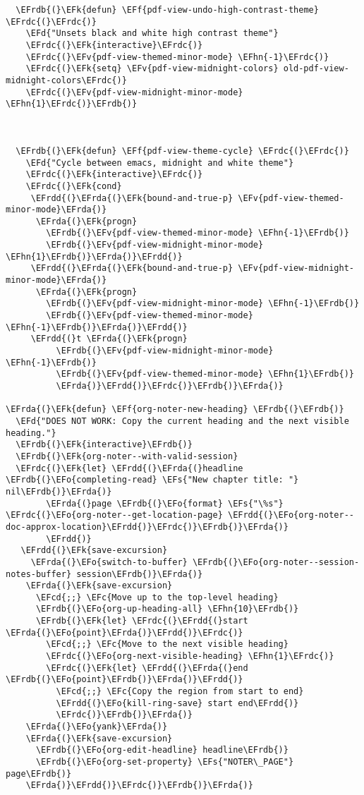 \documentclass[a4wide,10pt]{article}
\newcommand{\EFc}[1]{\textcolor{EFc}{#1}} %
\newcommand{\EFcd}[1]{\textcolor{EFcd}{#1}} %
\newcommand{\EFs}[1]{\textcolor{EFs}{#1}} %
\newcommand{\EFd}[1]{\textcolor{EFd}{#1}} %
\newcommand{\EFk}[1]{\textcolor{EFk}{#1}} %
\newcommand{\EFf}[1]{\textcolor{EFf}{#1}} %
\newcommand{\EFv}[1]{\textcolor{EFv}{#1}} %
\newcommand{\EFo}[1]{\textcolor{EFo}{#1}} %
\newcommand{\EFhn}[1]{\textcolor{EFhn}{\textbf{#1}}} %
\newcommand{\EFrda}[1]{\textcolor{EFrda}{#1}} %
\newcommand{\EFrdb}[1]{\textcolor{EFrdb}{#1}} %
\newcommand{\EFrdc}[1]{\textcolor{EFrdc}{#1}} %
\newcommand{\EFrdd}[1]{\textcolor{EFrdd}{#1}} %
\begin{document}
\begin{Code}
\begin{Verbatim}
  \EFrdb{(}\EFk{defun} \EFf{pdf-view-undo-high-contrast-theme} \EFrdc{(}\EFrdc{)}
    \EFd{"Unsets black and white high contrast theme"}
    \EFrdc{(}\EFk{interactive}\EFrdc{)}
    \EFrdc{(}\EFv{pdf-view-themed-minor-mode} \EFhn{-1}\EFrdc{)}
    \EFrdc{(}\EFk{setq} \EFv{pdf-view-midnight-colors} old-pdf-view-midnight-colors\EFrdc{)}
    \EFrdc{(}\EFv{pdf-view-midnight-minor-mode} \EFhn{1}\EFrdc{)}\EFrdb{)}



  \EFrdb{(}\EFk{defun} \EFf{pdf-view-theme-cycle} \EFrdc{(}\EFrdc{)}
    \EFd{"Cycle between emacs, midnight and white theme"}
    \EFrdc{(}\EFk{interactive}\EFrdc{)}
    \EFrdc{(}\EFk{cond}
     \EFrdd{(}\EFrda{(}\EFk{bound-and-true-p} \EFv{pdf-view-themed-minor-mode}\EFrda{)}
      \EFrda{(}\EFk{progn}
        \EFrdb{(}\EFv{pdf-view-themed-minor-mode} \EFhn{-1}\EFrdb{)}
        \EFrdb{(}\EFv{pdf-view-midnight-minor-mode} \EFhn{1}\EFrdb{)}\EFrda{)}\EFrdd{)}
     \EFrdd{(}\EFrda{(}\EFk{bound-and-true-p} \EFv{pdf-view-midnight-minor-mode}\EFrda{)}
      \EFrda{(}\EFk{progn}
        \EFrdb{(}\EFv{pdf-view-midnight-minor-mode} \EFhn{-1}\EFrdb{)}
        \EFrdb{(}\EFv{pdf-view-themed-minor-mode} \EFhn{-1}\EFrdb{)}\EFrda{)}\EFrdd{)}
     \EFrdd{(}t \EFrda{(}\EFk{progn}
          \EFrdb{(}\EFv{pdf-view-midnight-minor-mode} \EFhn{-1}\EFrdb{)}
          \EFrdb{(}\EFv{pdf-view-themed-minor-mode} \EFhn{1}\EFrdb{)}
          \EFrda{)}\EFrdd{)}\EFrdc{)}\EFrdb{)}\EFrda{)}

\EFrda{(}\EFk{defun} \EFf{org-noter-new-heading} \EFrdb{(}\EFrdb{)}
  \EFd{"DOES NOT WORK: Copy the current heading and the next visible heading."}
  \EFrdb{(}\EFk{interactive}\EFrdb{)}
  \EFrdb{(}\EFk{org-noter--with-valid-session}
  \EFrdc{(}\EFk{let} \EFrdd{(}\EFrda{(}headline \EFrdb{(}\EFo{completing-read} \EFs{"New chapter title: "} nil\EFrdb{)}\EFrda{)}
        \EFrda{(}page \EFrdb{(}\EFo{format} \EFs{"\%s"} \EFrdc{(}\EFo{org-noter--get-location-page} \EFrdd{(}\EFo{org-noter--doc-approx-location}\EFrdd{)}\EFrdc{)}\EFrdb{)}\EFrda{)}
        \EFrdd{)}
   \EFrdd{(}\EFk{save-excursion}
     \EFrda{(}\EFo{switch-to-buffer} \EFrdb{(}\EFo{org-noter--session-notes-buffer} session\EFrdb{)}\EFrda{)}
    \EFrda{(}\EFk{save-excursion}
      \EFcd{;;} \EFc{Move up to the top-level heading}
      \EFrdb{(}\EFo{org-up-heading-all} \EFhn{10}\EFrdb{)}
      \EFrdb{(}\EFk{let} \EFrdc{(}\EFrdd{(}start \EFrda{(}\EFo{point}\EFrda{)}\EFrdd{)}\EFrdc{)}
        \EFcd{;;} \EFc{Move to the next visible heading}
        \EFrdc{(}\EFo{org-next-visible-heading} \EFhn{1}\EFrdc{)}
        \EFrdc{(}\EFk{let} \EFrdd{(}\EFrda{(}end \EFrdb{(}\EFo{point}\EFrdb{)}\EFrda{)}\EFrdd{)}
          \EFcd{;;} \EFc{Copy the region from start to end}
          \EFrdd{(}\EFo{kill-ring-save} start end\EFrdd{)}
          \EFrdc{)}\EFrdb{)}\EFrda{)}
    \EFrda{(}\EFo{yank}\EFrda{)}
    \EFrda{(}\EFk{save-excursion}
      \EFrdb{(}\EFo{org-edit-headline} headline\EFrdb{)}
      \EFrdb{(}\EFo{org-set-property} \EFs{"NOTER\_PAGE"} page\EFrdb{)}
    \EFrda{)}\EFrdd{)}\EFrdc{)}\EFrdb{)}\EFrda{)}


\end{Verbatim}
\end{Code}
\end{document}
